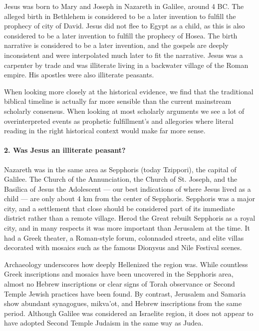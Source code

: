 Jesus was born to Mary and Joseph in Nazareth in Galilee, around 4 BC.
The alleged birth in Bethlehem is considered to be a later invention to fulfill the prophecy of city of David.
Jesus did not flee to Egypt as a child, as this is also considered to be a later invention to fulfill the prophecy of Hosea.
The birth narrative is considered to be a later invention, and the gospels are deeply inconsistent and were interpolated much later to fit the narrative.
Jesus was a carpenter by trade and was illiterate living in a backwater village of the Roman empire.
His apostles were also illiterate peasants.

When looking more closely at the historical evidence, we find that the traditional biblical timeline is actually far more sensible than the current mainstream scholarly consensus.
When looking at most scholarly arguments we see a lot of overinterpreted events as prophetic fulfillment's and allegories where literal reading in the right historical context would make far more sense.

\paragraph{2. Was Jesus an illiterate peasant?}\label{par:nazareth-was-not-a-backwater-village.}

Nazareth was in the same area as Sepphoris (today Tzippori), the capital of Galilee.
The Church of the Annunciation, the Church of St. Joseph, and the Basilica of Jesus the Adolescent — our best indications of where Jesus lived as a child — are only about 4 km from the center of Sepphoris.
Sepphoris was a major city, and a settlement that close should be considered part of its immediate district rather than a remote village.
Herod the Great rebuilt Sepphoris as a royal city, and in many respects it was more important than Jerusalem at the time.
It had a Greek theater, a Roman-style forum, colonnaded streets, and elite villas decorated with mosaics such as the famous Dionysus and Nile Festival scenes.

Archaeology underscores how deeply Hellenized the region was.
While countless Greek inscriptions and mosaics have been uncovered in the Sepphoris area, almost no Hebrew inscriptions or clear signs of Torah observance or Second Temple Jewish practices have been found.
By contrast, Jerusalem and Samaria show abundant synagogues, mikva’ot, and Hebrew inscriptions from the same period.
Although Galilee was considered an Israelite region, it does not appear to have adopted Second Temple Judaism in the same way as Judea.

